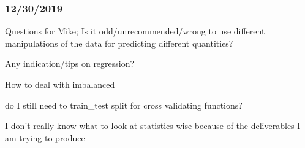 \subsubsection{12/30/2019}
Questions for Mike;
Is it odd/unrecommended/wrong to use different manipulations of the data
for predicting different quantities?

Any indication/tips on regression?

How to deal with imbalanced

do I still need to train_test split for cross validating functions?

I don't really know what to look at statistics wise because of
the deliverables I am trying to produce